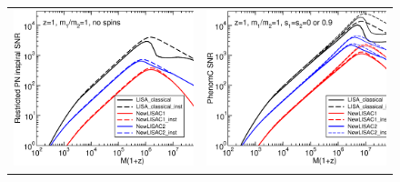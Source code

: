 \documentclass{iopart}
\begin{document}


%
\begin{figure}[H]
\begin{center}
\begin{tabular}{cc}
\includegraphics[scale=0.33,clip=true]{FigEmanuele/SNRNewLISAinsp.eps}
&\includegraphics[scale=0.33,clip=true]{FigEmanuele/SNRNewLISAIMR.eps}\\

\end{tabular}
\end{center}
\end{figure}
\end{document}
